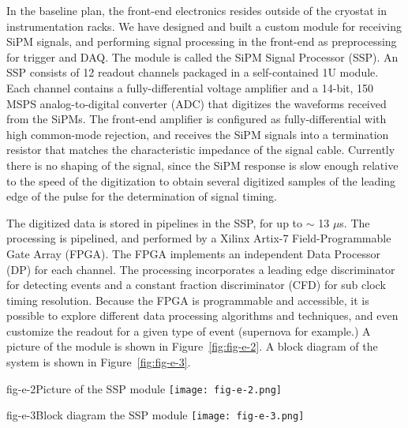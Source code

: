 In the baseline plan, the front-end electronics resides outside of the
cryostat in instrumentation racks.  We have designed and built a
custom module for receiving SiPM signals, and performing signal
processing in the front-end as preprocessing for trigger and DAQ.  The
module is called the SiPM Signal Processor (SSP).  An SSP consists of
12 readout channels packaged in a self-contained 1U module.  Each
channel contains a fully-differential voltage amplifier and a 14-bit,
150 MSPS analog-to-digital converter (ADC) that digitizes the
waveforms received from the SiPMs.  The front-end amplifier is
configured as fully-differential with high common-mode rejection, and
receives the SiPM signals into a termination resistor that matches the
characteristic impedance of the signal cable.  Currently there is no
shaping of the signal, since the SiPM response is slow enough relative
to the speed of the digitization to obtain several digitized samples
of the leading edge of the pulse for the determination of signal
timing.

The digitized data is stored in pipelines in the SSP, for up to $\sim$
13 $\mu$s.  The processing is pipelined, and performed by a Xilinx
Artix-7 Field-Programmable Gate Array (FPGA).  The FPGA implements an
independent Data Processor (DP) for each channel.  The processing
incorporates a leading edge discriminator for detecting events and a
constant fraction discriminator (CFD) for sub clock timing resolution.
Because the FPGA is programmable and accessible, it is possible to
explore different data processing algorithms and techniques, and even
customize the readout for a given type of event (supernova for
example.)  A picture of the module is shown in Figure~\ref{fig:fig-e-2}.
A block diagram of the system is shown in Figure~\ref{fig:fig-e-3}.

\begin{cdrfigure}{fig-e-2}{Picture of the SSP module}
\texttt{[image: fig-e-2.png]}
\end{cdrfigure}

\begin{cdrfigure}{fig-e-3}{Block diagram the SSP module}
\texttt{[image: fig-e-3.png]}
\end{cdrfigure}

